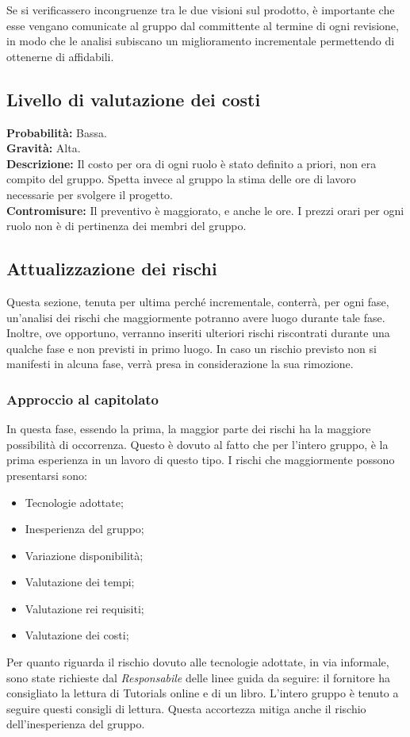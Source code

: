 \documentclass[a4paper]{article}
\begin{document}
				Se si verificassero incongruenze tra le due visioni sul prodotto, è importante che esse vengano comunicate 
				al gruppo dal committente al termine di ogni revisione, in modo che le analisi subiscano un miglioramento 
				incrementale permettendo di ottenerne di affidabili.
		\subsection{Livello di valutazione dei costi}
			\textbf{Probabilità:} Bassa. 
			\\
			\textbf{Gravità:} Alta.
			\\
			\textbf{Descrizione:} Il costo per ora di ogni ruolo è stato definito a priori, non era compito del gruppo. Spetta invece al 
				gruppo la stima delle ore di lavoro necessarie per svolgere il progetto.
			\\
			\textbf{Contromisure:} Il preventivo è maggiorato, e anche le ore. I prezzi orari per ogni ruolo non è di pertinenza dei membri 
				del gruppo.
		\subsection{Attualizzazione dei rischi}
			Questa sezione, tenuta per ultima perché incrementale, conterrà, per ogni fase, un'analisi dei rischi che maggiormente potranno
			avere luogo durante tale fase. Inoltre, ove opportuno, verranno inseriti ulteriori rischi riscontrati durante una qualche fase e 
			non previsti in primo luogo. In caso un rischio previsto non si manifesti in alcuna fase, verrà presa in considerazione la sua rimozione.
			
			\subsubsection{Approccio al capitolato}
				In questa fase, essendo la prima, la maggior parte dei rischi ha la maggiore possibilità di occorrenza. Questo è 
				dovuto al fatto che per l'intero gruppo, è la prima esperienza in un lavoro di questo tipo. I rischi che maggiormente 
				possono presentarsi sono:
				\begin{itemize}
					\item Tecnologie adottate;
					\item Inesperienza del gruppo;
					\item Variazione disponibilità;
					\item Valutazione dei tempi;
					\item Valutazione rei requisiti;
					\item Valutazione dei costi;
				\end{itemize}
				Per quanto riguarda il rischio dovuto alle tecnologie adottate, in via informale, sono state richieste dal \emph{Responsabile}
				delle linee guida da seguire: il fornitore ha consigliato la lettura di Tutorials online e di un libro. L'intero gruppo è tenuto 
				a seguire questi consigli di lettura. Questa accortezza mitiga anche il rischio dell'inesperienza del gruppo.
				
\end{document}
